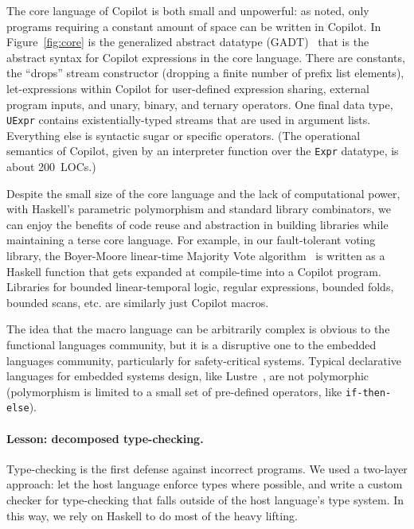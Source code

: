 \documentclass[preprint]{sigplanconf}
\begin{document}
The core language of Copilot is both small and unpowerful: as noted, only
programs requiring a constant amount of space can be written in Copilot.  In
Figure~\ref{fig:core} is the generalized abstract datatype (GADT)~\cite{gadts}
that is the abstract syntax for Copilot expressions in the core language.  There
are constants, the ``drops'' stream constructor (dropping a finite number of
prefix list elements), let-expressions within Copilot for user-defined
expression sharing, external program inputs, and unary, binary, and ternary
operators.  One final data type, {\tt UExpr} contains existentially-typed
streams that are used in argument lists.  Everything else is syntactic sugar or
specific operators.  (The operational semantics of Copilot, given by an
interpreter function over the {\tt Expr} datatype, is about 200~LOCs.)

Despite the small size of the core language and the lack of computational power,
with Haskell's parametric polymorphism and standard library combinators, we can
enjoy the benefits of code reuse and abstraction in building libraries while
maintaining a terse core language.  For example, in our fault-tolerant voting
library, the Boyer-Moore linear-time Majority Vote algorithm~\cite{mjrty} is
written as a Haskell function that gets expanded at compile-time into a Copilot
program.  Libraries for bounded linear-temporal logic, regular expressions,
bounded folds, bounded scans, etc. are similarly just Copilot macros.

The idea that the macro language can be arbitrarily complex is obvious to the
functional languages community, but it is a disruptive one to the embedded
languages community, particularly for safety-critical systems.  Typical
declarative languages for embedded systems design, like
Lustre~\cite{CaspiPHP87}, are not polymorphic (polymorphism is limited to a
small set of pre-defined operators, like {\tt if-then-else}).

\paragraph{Lesson: decomposed type-checking.}

Type-checking is the first defense against incorrect programs.  We used a
two-layer approach: let the host language enforce types where possible, and
write a custom checker for type-checking that falls outside of the host
language's type system.  In this way, we rely on Haskell to do most of the heavy
lifting.
\end{document}
